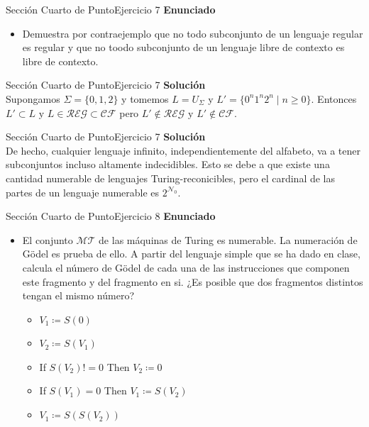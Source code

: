 \documentclass[10pt, envcountsect, presentation, aspectratio=169]{beamer}
\newcommand{\mt}{\ensuremath{\mathcal {MT}}}
\begin{document}

\begin{frame}{Sección Cuarto de Punto}{Ejercicio 7}
\textbf{Enunciado}
	\begin{itemize}
        \item Demuestra por contraejemplo que no todo subconjunto de un lenguaje regular es regular y que no toodo subconjunto de un lenguaje libre de contexto es libre de contexto.
    \end{itemize}
\end{frame}


\begin{frame}{Sección Cuarto de Punto}{Ejercicio 7}
    \textbf{Solución}\\
    Supongamos $\Sigma = \{0,1,2\}$ y tomemos $L = U_\Sigma$ y $L'=\{0^n1^n2^n \mid n \geq 0 \}.$ Entonces $L' \subset L \text{ y } L \in \mathcal{REG} \subset \mathcal{CF}$ pero $L' \notin \mathcal{REG} \text{ y } L' \notin \mathcal{CF}.$
\end{frame}


\begin{frame}{Sección Cuarto de Punto}{Ejercicio 7}
    \textbf{Solución}\\
    De hecho, cualquier lenguaje infinito, independientemente del alfabeto, va a tener subconjuntos incluso altamente indecidibles. Esto se debe a que existe una cantidad numerable de lenguajes Turing-reconicibles, pero el cardinal de las partes de un lenguaje numerable es $2^{\mathcal{N}_0}.$
\end{frame}


\begin{frame}{Sección Cuarto de Punto}{Ejercicio 8}
    \textbf{Enunciado}
    \begin{itemize}
        \item El conjunto $\mt$ de las máquinas de Turing es numerable. La numeración de Gödel es prueba de ello. A partir del lenguaje simple que se ha dado en clase, calcula el número de Gödel de cada una de las instrucciones que componen este fragmento y del fragmento en si. ¿Es posible que dos fragmentos distintos tengan el mismo número?
        \begin{itemize}
            \item[] $V_1 \coloneqq S(0)$
            \item[] $V_2 \coloneqq S(V_1)$
            \item[] If $S(V_2)!=0$ Then $V_2 \coloneqq0$
            \item[] If $S(V_1)=0$ Then $V_1 \coloneqq S(V_2)$
            \item[] $V_1 \coloneqq S(S(V_2))$
        \end{itemize}
    \end{itemize}
\end{frame}
\end{document}
